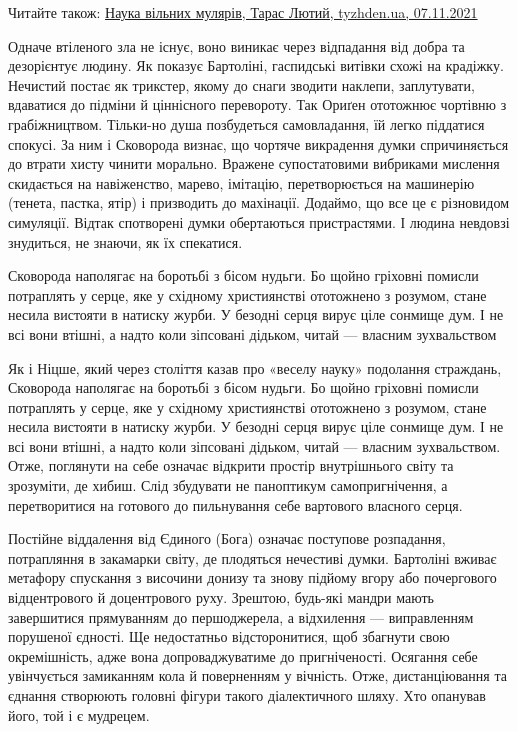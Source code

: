 Читайте також: \href{https://tyzhden.ua/Columns/50/253562}{Наука вільних %
мулярів, Тарас Лютий, tyzhden.ua, 07.11.2021}

Одначе втіленого зла не існує, воно виникає через відпадання від добра та
дезорієнтує людину. Як показує Бартоліні, гаспидські витівки схожі на крадіжку.
Нечистий постає як трикстер, якому до снаги зводити наклепи, заплутувати,
вдаватися до підміни й ціннісного перевороту. Так Ориґен ототожнює чортівню з
грабіжництвом. Тільки-но душа позбудеться самовладання, їй легко піддатися
спокусі. За ним і Сковорода визнає, що чортяче викрадення думки спричиняється
до втрати хисту чинити морально. Вражене супостатовими вибриками мислення
скидається на навіженство, марево, імітацію, перетворюється на машинерію
(тенета, пастка, ятір) і призводить до махінації. Додаймо, що все це є
різновидом симуляції. Відтак спотворені думки обертаються пристрастями. І
людина невдовзі знудиться, не знаючи, як їх спекатися.

\begin{zznagolos}
Сковорода наполягає на боротьбі з бісом нудьги. Бо щойно гріховні помисли
потраплять у серце, яке у східному християнстві ототожнено з розумом, стане
несила вистояти в натиску журби. У безодні серця вирує ціле сонмище дум. І не
всі вони втішні, а надто коли зіпсовані дідьком, читай — власним зухвальством 	
\end{zznagolos}

Як і Ніцше, який через століття казав про «веселу науку» подолання страждань,
Сковорода наполягає на боротьбі з бісом нудьги. Бо щойно гріховні помисли
потраплять у серце, яке у східному християнстві ототожнено з розумом, стане
несила вистояти в натиску журби. У безодні серця вирує ціле сонмище дум. І не
всі вони втішні, а надто коли зіпсовані дідьком, читай — власним зухвальством.
Отже, поглянути на себе означає відкрити простір внутрішнього світу та
зрозуміти, де хибиш. Слід збудувати не паноптикум самопригнічення, а
перетворитися на готового до пильнування себе вартового власного серця.

Постійне віддалення від Єдиного (Бога) означає поступове розпадання,
потрапляння в закамарки світу, де плодяться нечестиві думки. Бартоліні вживає
метафору спускання з височини донизу та знову підйому вгору або почергового
відцентрового й доцентрового руху. Зрештою, будь-які мандри мають завершитися
прямуванням до першоджерела, а відхилення — виправленням порушеної єдності. Ще
недостатньо відсторонитися, щоб збагнути свою окремішність, адже вона
допроваджуватиме до пригніченості. Осягання себе увінчується замиканням кола й
поверненням у вічність. Отже, дистанціювання та єднання створюють головні
фігури такого діалектичного шляху. Хто опанував його, той і є мудрецем.

